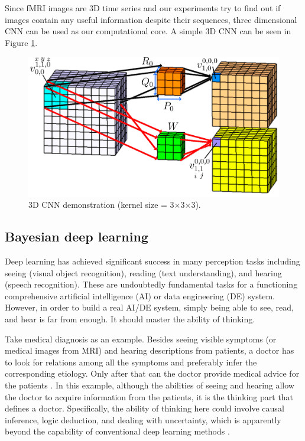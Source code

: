 \documentclass[preprint,12pt]{elsarticle}
\begin{document}
Since fMRI images are 3D time series and our experiments try to find out if images contain any useful information despite their sequences, three dimensional CNN can be used as our computational core. A simple 3D CNN can be seen in Figure \ref{fig:CnnSample}.

\begin{figure}
	\begin{center}
	\includegraphics[width=0.8\linewidth]{images/3dCnn}
	\end{center}
	\caption{3D CNN demonstration (kernel size = 3$\times$3$\times$3).}
	\label{fig:CnnSample}
\end{figure}




\subsection{Bayesian deep learning}
\label{section:bayesianDL}
Deep learning has achieved significant success in many perception tasks including seeing (visual object recognition), reading (text understanding), and hearing (speech recognition). These are undoubtedly fundamental tasks for a functioning comprehensive artificial intelligence (AI) or data engineering (DE) system. However, in order to build a real AI/DE system, simply being able to see, read, and hear is far from enough. It should master
the ability of thinking.

Take medical diagnosis as an example. Besides seeing visible symptoms (or medical images from MRI) and hearing descriptions from patients, a doctor has to look for relations among all the symptoms and preferably infer the corresponding etiology. Only after that can the doctor provide medical advice for the patients \cite{GonzalezCastillo2015}. In this example, although the abilities of seeing and hearing allow the doctor to acquire information from the patients, it is the thinking part that defines a doctor. Specifically, the ability of thinking here could involve causal inference, logic deduction, and dealing with uncertainty, which is apparently beyond the capability of conventional deep learning methods \cite{Wang2016}.
\end{document}
